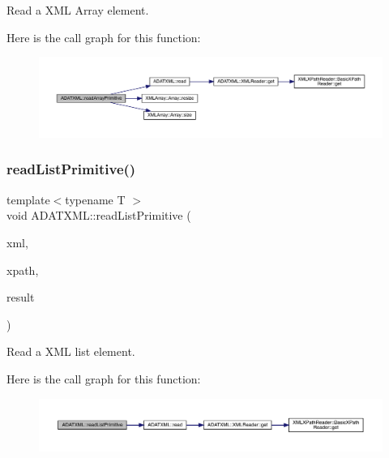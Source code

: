 Read a X\+ML Array element. 

Here is the call graph for this function\+:\nopagebreak
\begin{figure}[H]
\begin{center}
\leavevmode
\includegraphics[width=350pt]{d7/da0/namespaceADATXML_aaefbc18d9018a09271e0b949526730ab_cgraph}
\end{center}
\end{figure}
\mbox{\label{namespaceADATXML_ad39ebe1fb986ec4121572e877b5dacb8}} 
\subsubsection{\texorpdfstring{readListPrimitive()}{readListPrimitive()}}
{\footnotesize\ttfamily template$<$typename T $>$ \\
void A\+D\+A\+T\+X\+M\+L\+::read\+List\+Primitive (\begin{DoxyParamCaption}\item[{\mbox{\hyperlink{classADATXML_1_1XMLReader}{X\+M\+L\+Reader}} \&}]{xml,  }\item[{const std\+::string \&}]{xpath,  }\item[{std\+::list$<$ T $>$ \&}]{result }\end{DoxyParamCaption})}



Read a X\+ML list element. 

Here is the call graph for this function\+:\nopagebreak
\begin{figure}[H]
\begin{center}
\leavevmode
\includegraphics[width=350pt]{d7/da0/namespaceADATXML_ad39ebe1fb986ec4121572e877b5dacb8_cgraph}
\end{center}
\end{figure}
\mbox{\label{namespaceADATXML_a485bbc9069166009de61296df9dfe74b}} 
